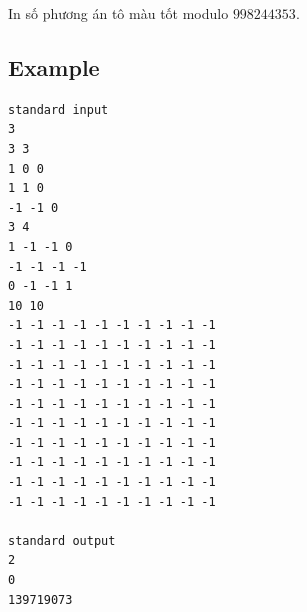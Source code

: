 \documentclass[11pt]{article}
\begin{document}
In số phương án tô màu tốt modulo $998244353$.

\subsection*{Example}

\begin{verbatim}
standard input
3
3 3
1 0 0
1 1 0
-1 -1 0
3 4
1 -1 -1 0
-1 -1 -1 -1
0 -1 -1 1
10 10
-1 -1 -1 -1 -1 -1 -1 -1 -1 -1
-1 -1 -1 -1 -1 -1 -1 -1 -1 -1
-1 -1 -1 -1 -1 -1 -1 -1 -1 -1
-1 -1 -1 -1 -1 -1 -1 -1 -1 -1
-1 -1 -1 -1 -1 -1 -1 -1 -1 -1
-1 -1 -1 -1 -1 -1 -1 -1 -1 -1
-1 -1 -1 -1 -1 -1 -1 -1 -1 -1
-1 -1 -1 -1 -1 -1 -1 -1 -1 -1
-1 -1 -1 -1 -1 -1 -1 -1 -1 -1
-1 -1 -1 -1 -1 -1 -1 -1 -1 -1

standard output
2
0
139719073
\end{verbatim}
\end{document}
